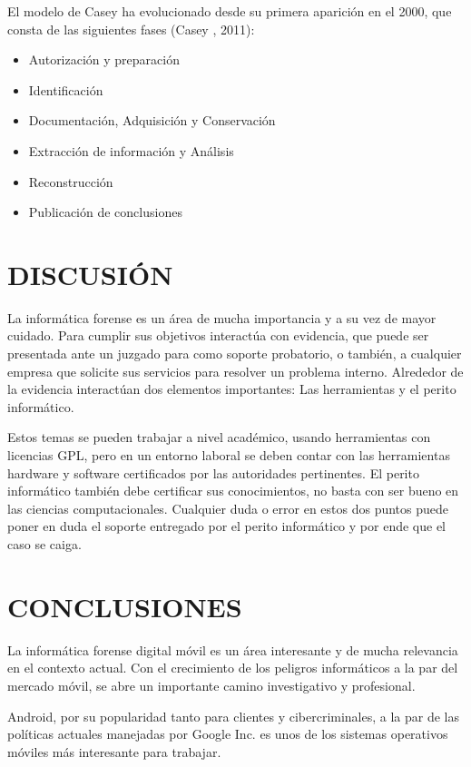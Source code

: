 \documentclass[times,5p, twocolumn]{elsarticle}
\begin{document}
El modelo de Casey ha evolucionado
desde su primera aparición en el 2000, que
consta de las siguientes fases (Casey ,
2011):

\begin{itemize}
    \item{Autorización y preparación} 
    \item{Identificación} 
    \item{Documentación, Adquisición y
Conservación} 
    \item{Extracción de información y Análisis} 
    \item{Reconstrucción} 
    \item{Publicación de conclusiones} 
\end{itemize}
\item 

\section{DISCUSIÓN }
La informática forense es un área de
mucha importancia y a su vez de mayor
cuidado. Para cumplir sus objetivos
interactúa con evidencia, que puede ser
presentada ante un juzgado para como
soporte probatorio, o también, a cualquier
empresa que solicite sus servicios para
resolver un problema interno. Alrededor de
la evidencia interactúan dos elementos
importantes: Las herramientas y el perito
informático. 

Estos temas se pueden trabajar a nivel
académico, usando herramientas con
licencias GPL, pero en un entorno laboral
se deben contar con las herramientas
hardware y software certificados por las
autoridades pertinentes. El perito
informático también debe certificar sus
conocimientos, no basta con ser bueno en
las ciencias computacionales. Cualquier
duda o error en estos dos puntos puede
poner en duda el soporte entregado por el
perito informático y por ende que el caso
se caiga.

\section{CONCLUSIONES}

La informática forense digital móvil es un
área interesante y de mucha relevancia en
el contexto actual. Con el crecimiento de
los peligros informáticos a la par del
mercado móvil, se abre un importante
camino investigativo y profesional.

Android, por su popularidad tanto para
clientes y cibercriminales, a la par de las
políticas actuales manejadas por Google
Inc. es unos de los sistemas operativos
móviles más interesante para trabajar. 
\end{document}
